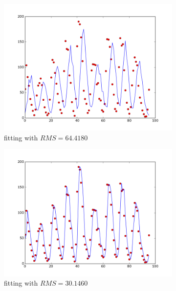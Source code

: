 \documentclass{article}
\begin{document}
\begin{figure}[!ht]
    \centering
    \begin{subfigure}[b]{0.5\textwidth}
        \includegraphics[width=\textwidth]{Part2/II211.png}
        \caption{fitting with $RMS = 64.4180$}
    \end{subfigure}%
    \begin{subfigure}[b]{0.5\textwidth}
        \includegraphics[width=\textwidth]{Part2/II212.png}
        \caption{fitting with $RMS = 30.1460$}
    \end{subfigure}
    \begin{subfigure}[b]{0.5\textwidth}

\end{subfigure}
\end{figure}
\end{document}
